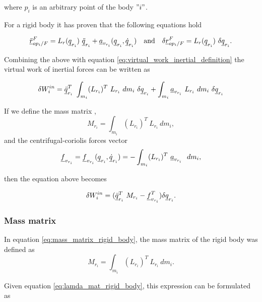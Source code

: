 where $p_i$ is an arbitrary point of the body $"i"$.

For a rigid body it has proven that the following equations hold

\[
    \pvec{\ddot{r}}{op_{i}}{F}{F} = L_{r}(\vecd{q}_{r_{i}}) \ 
    \vecd{\ddot{q}}_{r_{i}} + \vecd{a}_{v_{r_i}}(\vecd{q}_{r_{i}}, 
    \vecd{\dot{q}}_{r_{i}}) \quad \text{and} \quad \delta \pvec{r}{op_{i}}{F}{F} 
    = L_{r}(\vecd{q}_{r_{i}})\ \delta\vecd{q}_{r_{i}}.
\]

Combining the above with equation \eqref{eq:virtual_work_inertial_definition} 
the virtual work of inertial forces can be written as 

\[
    \delta W^{in}_{i} = 
    \vecd{\ddot{q}}_{r_{i}}^{T}\ \int_{m_i} (L_{r_i})^{T} \ L_{r_i}\ dm_{i}\ \delta\vecd{q}_{r_{i}} 
    + \int_{m_i} \vecd{a}_{v_{r_i}}\ L_{r_i}\ dm_{i}\ \delta\vecd{q}_{r_{i}} 
\]

If we define the mass matrix ,
\begin{equation}
    M_{r_i} = \int_{m_i} (L_{r_i})^{T} \ L_{r_i}\ dm_{i},
    \label{eq:mass_matrix_rigid_body}
\end{equation}
and the centrifugal-coriolis forces vector
\begin{equation}
    \vecd{f}_{v_{r_i}} = \vecd{f}_{v_{r_i}}(\vecd{q}_{r_{i}}, 
    \vecd{\dot{q}}_{r_{i}}) = - \int_{m_i} (L_{r_i})^{T} \ \vecd{a}_{v_{r_i}}\ 
    \ dm_{i},
    \label{eq:coriolis_forces_rigid_body}
\end{equation}

then the equation above becomes

\begin{equation}
    \delta W^{in}_{i} = (\underline{\ddot{q}}_{r_{i}}^{T}\ M_{r_i}  
    - \underline{f}_{v_{r_i}}^{T})\delta\underline{q}_{r_{i}}.
    \label{eq:virtual_inertial_work_rigid_body}
 \end{equation}



\subsubsection{Mass matrix}
In equation \eqref{eq:mass_matrix_rigid_body}, the mass matrix of the rigid 
body was defined as 
\[
    M_{r_i} = \int_{m_i} (L_{r_i})^{T} \ L_{r_i}\ dm_{i}.
\]   

Given equation \eqref{eq:lamda_mat_rigid_body}, this expression can be 
formulated as 

